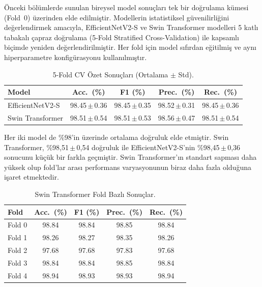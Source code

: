 \documentclass[conference]{IEEEtran}
\begin{document}
Önceki bölümlerde sunulan bireysel model sonuçları tek bir doğrulama kümesi (Fold~0) üzerinden elde edilmiştir. Modellerin istatistiksel güvenilirliğini değerlendirmek amacıyla, EfficientNetV2-S ve Swin Transformer modelleri 5 katlı tabakalı çapraz doğrulama (5-Fold Stratified Cross-Validation) ile kapsamlı biçimde yeniden değerlendirilmiştir. Her fold için model sıfırdan eğitilmiş ve aynı hiperparametre konfigürasyonu kullanılmıştır.

\begin{table}[!ht]
\centering
\caption{5-Fold CV Özet Sonuçları (Ortalama $\pm$ Std).}
\label{tab:kfold_summary}
\begin{tabular}{lcccc}
\toprule
\textbf{Model} & \textbf{Acc.\ (\%)} & \textbf{F1 (\%)} & \textbf{Prec.\ (\%)} & \textbf{Rec.\ (\%)} \\
\midrule
EfficientNetV2-S    & 98.45\,$\pm$\,0.36 & 98.45\,$\pm$\,0.35 & 98.52\,$\pm$\,0.31 & 98.45\,$\pm$\,0.36 \\
Swin Transformer    & 98.51\,$\pm$\,0.54 & 98.51\,$\pm$\,0.53 & 98.56\,$\pm$\,0.47 & 98.51\,$\pm$\,0.54 \\
\bottomrule
\end{tabular}
\end{table}

Her iki model de \%98'in üzerinde ortalama doğruluk elde etmiştir. Swin Transformer, \%98,51\,$\pm$\,0,54 doğruluk ile EfficientNetV2-S'nin \%98,45\,$\pm$\,0,36 sonucunu küçük bir farkla geçmiştir. Swin Transformer'ın standart sapması daha yüksek olup fold'lar arası performans varyasyonunun biraz daha fazla olduğuna işaret etmektedir.

\begin{table}[!ht]
\centering
\caption{Swin Transformer Fold Bazlı Sonuçlar.}
\label{tab:swin_folds}
\begin{tabular}{lcccc}
\toprule
\textbf{Fold} & \textbf{Acc.\ (\%)} & \textbf{F1 (\%)} & \textbf{Prec.\ (\%)} & \textbf{Rec.\ (\%)} \\
\midrule
Fold 0 & 98.84 & 98.84 & 98.85 & 98.84 \\
Fold 1 & 98.26 & 98.27 & 98.35 & 98.26 \\
Fold 2 & 97.68 & 97.68 & 97.83 & 97.68 \\
Fold 3 & 98.84 & 98.84 & 98.85 & 98.84 \\
Fold 4 & 98.94 & 98.93 & 98.93 & 98.94 \\
\bottomrule
\end{tabular}
\end{table}
\end{document}
